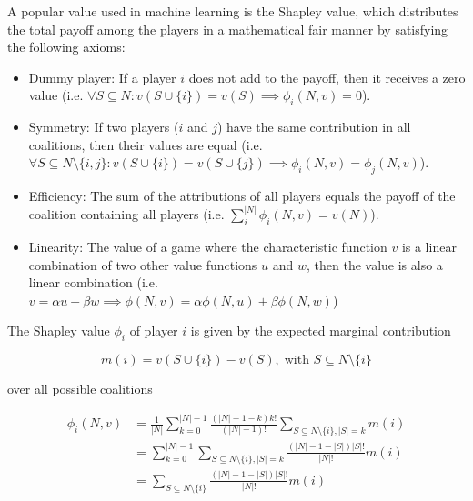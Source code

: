 A popular value used in machine learning is the Shapley value, which distributes
the total payoff among the players in a mathematical fair manner by satisfying the
following axioms:\cite{merrick2020explanation, shapley1953value}


\begin{itemize}
	\item Dummy player: If a player $i$ does not add to the payoff, then it receives a
	      zero value (i.e. $\forall S \subseteq N: v(S \cup \{i\}) = v(S) \implies \phi_i(N, v) = 0$).

	\item Symmetry: If two players ($i$ and $j$) have the same contribution in all coalitions, then
	      their values are equal (i.e. $\forall S \subseteq N \setminus \{i, j\}: v(S \cup \{i\}) = v(S \cup \{j\}) \implies \phi_i(N, v) = \phi_j(N, v)$).

	\item Efficiency: The sum of the attributions of all players equals the payoff of the coalition containing
	      all players (i.e. $\sum^{|N|}_i \phi_i(N, v) = v(N)$).

	\item Linearity: The value of a game where the characteristic function $v$ is a linear combination of
	      two other value functions $u$ and $w$, then the value is also a linear combination (i.e.
	      $v = \alpha u + \beta w \implies \phi(N, v) = \alpha \phi(N, u) + \beta \phi(N, w)$)
\end{itemize}


The Shapley value $\phi_i$ of player $i$ is given by the expected marginal contribution\cite{zhang2022gstarx}


\begin{equation}
	m(i) = v\left(S \cup \{i\}\right) - v\left(S\right), \; \text{with } S \subseteq N \setminus \{i\}
\end{equation}


over all possible coalitions


\begin{equation}
	\begin{aligned}
		\label{eq:Shapley}
		\phi_i(N, v) & = \frac{1}{|N|} \sum_{k=0}^{|N|-1} \frac{\left(|N| - 1 - k\right)k!}{\left(|N| - 1\right)!} \sum_{S \subseteq N \setminus \{i\}, |S| = k} m(i) \\
		             & = \sum_{k=0}^{|N| - 1} \sum_{S \subseteq N \setminus \{i\}, |S| = k} \frac{\left(|N| - 1 - |S|\right)|S|!}{|N|!} m(i)                          \\
		             & = \sum_{S \subseteq N \setminus \{i\}} \frac{\left(|N| - 1 - |S|\right)|S|!}{|N|!} m(i)
	\end{aligned}
\end{equation}


